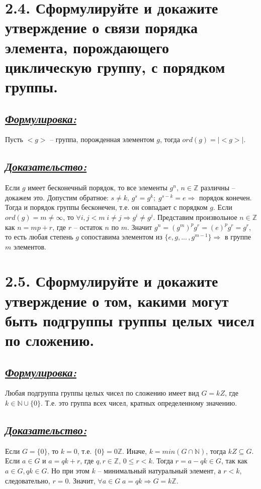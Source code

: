 \documentclass{article}
\begin{document}
\section*{\LARGE 2.4. Сформулируйте и докажите утверждение о связи порядка элемента, порождающего циклическую группу, с порядком группы.}
\subsection*{\Large \underline{\textit{Формулировка: }}}
Пусть $<g>$ -- группа, порожденная элементом $g$, тогда $ord(g) = |<g>|$.

\subsection*{\Large \underline{\textit{Доказательство: }}}
Если $g$ имеет бесконечный порядок, то все элементы $g^n,\, n \in \mathbb{Z}$ различны -- докажем это. Допустим обратное: $s \ne k,\, g^s = g^k;\; g^{s - k} = e \Rightarrow$ порядок конечен. Тогда и порядок группы бесконечен, т.е. он совпадает с порядком $g$.
\newline Если $ord(g) = m \ne \infty$, то $\forall i, j < m \; i \ne j \Rightarrow g^i \ne g^j$. Представим произвольное $n \in \mathbb{Z}$ как $n = mp + r$, где $r$ -- остаток $n$ по $m$. Значит $g^n = (g^m)^pg^r = (e)^pg^r = g^r$, то есть любая степень $g$ сопоставима элементом из $\{e, g, ...\,, g^{m - 1}\} \Rightarrow$ в группе $m$ элементов.

\section*{\LARGE 2.5. Сформулируйте и докажите утверждение о том, какими могут быть подгруппы группы целых чисел по сложению. }
\subsection*{\Large \underline{\textit{Формулировка: }}}
Любая подгруппа группы целых чисел по сложению имеет вид $G = kZ$, где $k \in \mathbb{N}\cup\{0\}$. Т.е. это группа всех чисел, кратных определенному значению.

\subsection*{\Large \underline{\textit{Доказательство: }}}
Если $G = \{0\}$, то $k = 0$, т.е. $\{0\} = 0\mathbb{Z}$. Иначе, $k = min(G \cap \mathbb{N})$, тогда $kZ \subseteq G$. Если $a \in G$ и $a = qk + r$, где $q,r \in \mathbb{Z}, \,0 \le r < k$. Тогда $r = a - qk \in G$, так как $a \in G, qk \in G$. Но при этом $k$ -- минимальный натуральный элемент, а $r < k$, следовательно, $r = 0$. Значит, $\forall a \in G \; a = qk \Rightarrow G = k\mathbb{Z}$.
\end{document}
